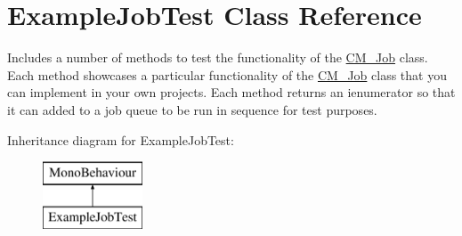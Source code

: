 \hypertarget{class_example_job_test}{}\section{Example\+Job\+Test Class Reference}
\label{class_example_job_test}


Includes a number of methods to test the functionality of the \hyperlink{class_c_m___job}{C\+M\+\_\+\+Job} class. Each method showcases a particular functionality of the \hyperlink{class_c_m___job}{C\+M\+\_\+\+Job} class that you can implement in your own projects. Each method returns an ienumerator so that it can added to a job queue to be run in sequence for test purposes.  


Inheritance diagram for Example\+Job\+Test\+:\begin{figure}[H]
\begin{center}
\leavevmode
\includegraphics[height=2.000000cm]{class_example_job_test}
\end{center}
\end{figure}
